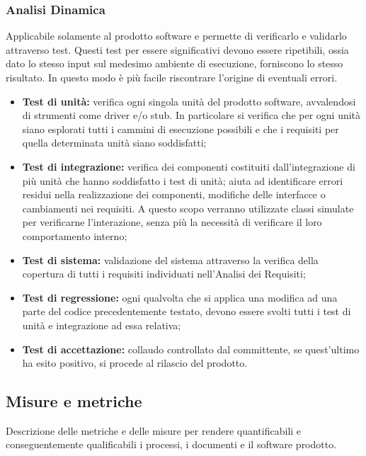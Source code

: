 		\subsubsection{Analisi Dinamica}
		Applicabile solamente al prodotto software e permette di verificarlo e validarlo attraverso test. Questi test per essere significativi devono essere ripetibili, ossia dato lo stesso input sul medesimo ambiente di esecuzione, forniscono lo stesso risultato. In questo modo è più facile riscontrare l'origine di eventuali errori.
			\begin{itemize}
				\item \textbf{Test di unità:} verifica ogni singola unità del prodotto software, avvalendosi di strumenti come driver e/o stub. In particolare si verifica che per ogni unità siano esplorati tutti i cammini di esecuzione possibili e che i requisiti per quella determinata unità siano soddisfatti;
				\item \textbf{Test di integrazione:} verifica dei componenti costituiti dall'integrazione di più unità che hanno soddisfatto i test di unità; aiuta ad identificare errori residui nella realizzazione dei componenti, modifiche delle interfacce o cambiamenti nei requisiti. A questo scopo verranno utilizzate classi simulate per verificarne l'interazione, senza più la necessità di verificare il loro comportamento interno;
				\item \textbf{Test di sistema:} validazione del sistema attraverso la verifica della copertura di tutti i requisiti individuati nell'Analisi dei Requisiti;
				\item \textbf{Test di regressione:} ogni qualvolta che si applica una modifica ad una parte del codice precedentemente testato, devono essere svolti tutti i test di unità e integrazione ad essa relativa;
				\item \textbf{Test di accettazione:} collaudo controllato dal committente, se quest'ultimo ha esito positivo, si procede al rilascio del prodotto.
			\end{itemize}

	\subsection{Misure e metriche}
	Descrizione delle metriche e delle misure per rendere quantificabili e conseguentemente qualificabili i processi, i documenti e il software prodotto.

